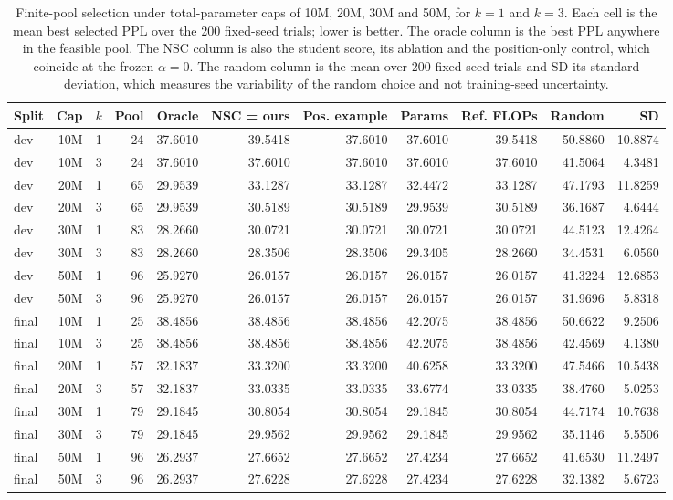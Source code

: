 \begin{table}[t]
\centering
\small
\caption{Finite-pool selection under total-parameter caps of 10M, 20M, 30M and 50M, for $k = 1$ and $k = 3$. Each cell is the mean best selected PPL over the 200 fixed-seed trials; lower is better. The oracle column is the best PPL anywhere in the feasible pool. The NSC column is also the student score, its ablation and the position-only control, which coincide at the frozen $\alpha = 0$. The random column is the mean over 200 fixed-seed trials and SD its standard deviation, which measures the variability of the random choice and not training-seed uncertainty.}
\label{tab:table3}
\setlength{\tabcolsep}{4pt}
\begin{tabular}{lrrrrrrrrrr}
\toprule
Split & Cap & $k$ & Pool & Oracle & NSC = ours & Pos. example & Params & Ref. FLOPs & Random & SD \\
\midrule
dev & 10M & 1 & 24 & 37.6010 & 39.5418 & 37.6010 & 37.6010 & 39.5418 & 50.8860 & 10.8874 \\
dev & 10M & 3 & 24 & 37.6010 & 37.6010 & 37.6010 & 37.6010 & 37.6010 & 41.5064 & 4.3481 \\
dev & 20M & 1 & 65 & 29.9539 & 33.1287 & 33.1287 & 32.4472 & 33.1287 & 47.1793 & 11.8259 \\
dev & 20M & 3 & 65 & 29.9539 & 30.5189 & 30.5189 & 29.9539 & 30.5189 & 36.1687 & 4.6444 \\
dev & 30M & 1 & 83 & 28.2660 & 30.0721 & 30.0721 & 30.0721 & 30.0721 & 44.5123 & 12.4264 \\
dev & 30M & 3 & 83 & 28.2660 & 28.3506 & 28.3506 & 29.3405 & 28.2660 & 34.4531 & 6.0560 \\
dev & 50M & 1 & 96 & 25.9270 & 26.0157 & 26.0157 & 26.0157 & 26.0157 & 41.3224 & 12.6853 \\
dev & 50M & 3 & 96 & 25.9270 & 26.0157 & 26.0157 & 26.0157 & 26.0157 & 31.9696 & 5.8318 \\
final & 10M & 1 & 25 & 38.4856 & 38.4856 & 38.4856 & 42.2075 & 38.4856 & 50.6622 & 9.2506 \\
final & 10M & 3 & 25 & 38.4856 & 38.4856 & 38.4856 & 42.2075 & 38.4856 & 42.4569 & 4.1380 \\
final & 20M & 1 & 57 & 32.1837 & 33.3200 & 33.3200 & 40.6258 & 33.3200 & 47.5466 & 10.5438 \\
final & 20M & 3 & 57 & 32.1837 & 33.0335 & 33.0335 & 33.6774 & 33.0335 & 38.4760 & 5.0253 \\
final & 30M & 1 & 79 & 29.1845 & 30.8054 & 30.8054 & 29.1845 & 30.8054 & 44.7174 & 10.7638 \\
final & 30M & 3 & 79 & 29.1845 & 29.9562 & 29.9562 & 29.1845 & 29.9562 & 35.1146 & 5.5506 \\
final & 50M & 1 & 96 & 26.2937 & 27.6652 & 27.6652 & 27.4234 & 27.6652 & 41.6530 & 11.2497 \\
final & 50M & 3 & 96 & 26.2937 & 27.6228 & 27.6228 & 27.4234 & 27.6228 & 32.1382 & 5.6723 \\
\bottomrule
\end{tabular}
\end{table}
